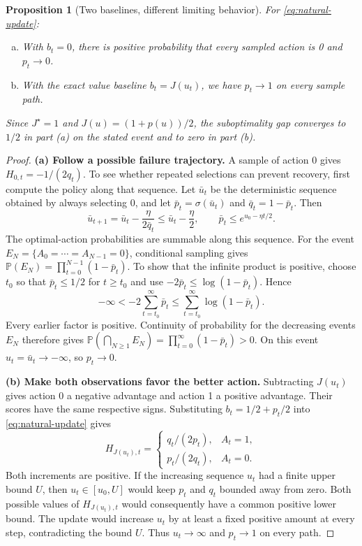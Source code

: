 \documentclass[11pt,twoside]{article}
\renewcommand{\P}{\mathbb P}
\newtheorem{proposition}[theorem]{Proposition}
\theoremstyle{definition}
\theoremstyle{remark}
\begin{document}
\begin{proposition}[Two baselines, different limiting behavior]
\label{prop:baseline-paths}
For \cref{eq:natural-update}:
\begin{enumerate}[(a)]
\item With $b_t=0$, there is positive probability that every sampled action
is 0 and $p_t\to0$.
\item With the exact value baseline $b_t=J(u_t)$, we have $p_t\to1$
on every sample path.
\end{enumerate}
Since $J^\star=1$ and $J(u)=(1+p(u))/2$, the suboptimality gap converges
to $1/2$ in part (a) on the stated event and to zero in part (b).
\end{proposition}
\begin{proof}
\textbf{(a) Follow a possible failure trajectory.}
A sample of action 0 gives $H_{0,t}=-1/(2q_t)$. To see whether repeated selections
can prevent recovery, first compute the policy along that sequence.
Let $\bar u_t$ be the deterministic sequence obtained by always selecting 0,
and let $\bar p_t=\sigma(\bar u_t)$ and $\bar q_t=1-\bar p_t$.
Then
\[
 \bar u_{t+1}=\bar u_t-\frac{\eta}{2\bar q_t}
 \le\bar u_t-\frac\eta2,\qquad
 \bar p_t\le e^{u_0-\eta t/2}.
\]
The optimal-action probabilities are summable along this sequence.
For the event $E_N=\{A_0=\cdots=A_{N-1}=0\}$, conditional sampling gives
$\P(E_N)=\prod_{t=0}^{N-1}(1-\bar p_t)$.
To show that the infinite product is positive, choose $t_0$ so that
$\bar p_t\le1/2$ for $t\ge t_0$ and use
$-2\bar p_t\le\log(1-\bar p_t)$. Hence
\[
 -\infty<-2\sum_{t=t_0}^\infty\bar p_t
 \le\sum_{t=t_0}^\infty\log(1-\bar p_t).
\]
Every earlier factor is positive. Continuity of probability for the
decreasing events $E_N$ therefore gives
$\P(\bigcap_{N\ge1}E_N)=\prod_{t=0}^\infty(1-\bar p_t)>0$.
On this event $u_t=\bar u_t\to-\infty$, so $p_t\to0$.

\textbf{(b) Make both observations favor the better action.}
Subtracting $J(u_t)$ gives action 0 a negative advantage and action 1 a
positive advantage. Their scores have the same respective signs.
Substituting $b_t=1/2+p_t/2$ into \cref{eq:natural-update} gives
\[
 H_{J(u_t),t}=\begin{cases}q_t/(2p_t),&A_t=1,\\p_t/(2q_t),&A_t=0.
 \end{cases}
\]
Both increments are positive. If the increasing sequence $u_t$ had a finite
upper bound $U$, then $u_t\in[u_0,U]$ would keep $p_t$ and $q_t$ bounded
away from zero. Both possible values of $H_{J(u_t),t}$ would consequently have a
common positive lower bound. The update would increase $u_t$ by at least a
fixed positive amount at every step, contradicting the bound $U$.
Thus $u_t\to\infty$ and $p_t\to1$ on every path.
\end{proof}
\end{document}
